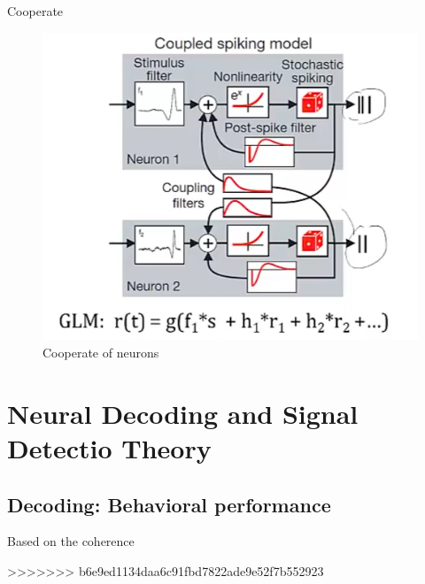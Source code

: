 \documentclass{book}
\begin{document}
Cooperate

\begin{figure}[h]
\centering
\includegraphics[width=0.7\linewidth]{figures/twoneuron}
\caption{Cooperate of neurons}
\label{fig:twoneuron}
\end{figure}

\chapter{Neural Decoding and Signal Detectio Theory}

\section{Decoding: Behavioral performance}

Based on the coherence


>>>>>>> b6e9ed1134daa6c91fbd7822ade9e52f7b552923





 
\end{document}
